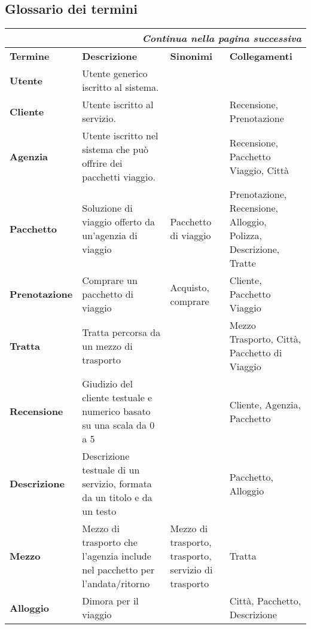 \subsection{Glossario dei termini}
\begin{center}
    \begin{tabularx}{\textwidth}{p{} X p{} p{}}
        \caption{Dizionario termini}\\\toprule\endfirsthead
        \toprule\endhead
        \midrule\multicolumn{4}{r}{\itshape Continua nella pagina successiva}\\\midrule\endfoot
        \bottomrule\endlastfoot
        \textbf{Termine} & \textbf{Descrizione} & \textbf{Sinonimi} & \textbf{Collegamenti} \\
        \midrule
        \textbf{Utente} & Utente generico iscritto al sistema. & &
        \\\midrule
        \textbf{Cliente} & Utente iscritto al servizio. & & Recensione, Prenotazione
        \\\midrule
        \textbf{Agenzia} & Utente iscritto nel sistema che può offrire dei pacchetti viaggio. & & Recensione, Pacchetto Viaggio, Città
        \\\midrule
        \textbf{Pacchetto} & Soluzione di viaggio offerto da un'agenzia di viaggio & Pacchetto di viaggio & Prenotazione, Recensione, Alloggio, Polizza, Descrizione, Tratte
        \\\midrule
        \textbf{Prenotazione} & Comprare un pacchetto di viaggio & Acquisto, comprare & Cliente, Pacchetto Viaggio
        \\\midrule
        \textbf{Tratta} & Tratta percorsa da un mezzo di trasporto & & Mezzo Trasporto, Città, Pacchetto di Viaggio
        \\\midrule
        \textbf{Recensione} & Giudizio del cliente testuale e numerico basato su una scala da 0 a 5 & & Cliente, Agenzia, Pacchetto 
        \\\midrule
        \textbf{Descrizione} & Descrizione testuale di un servizio, formata da un titolo e da un testo & & Pacchetto, Alloggio
        \\\midrule
        \textbf{Mezzo} & Mezzo di trasporto che l'agenzia include nel pacchetto per l'andata/ritorno & Mezzo di trasporto, trasporto, servizio di trasporto & Tratta
        \\\midrule
        \textbf{Alloggio} & Dimora per il viaggio & & Città, Pacchetto, Descrizione
        \\
    \end{tabularx}
\end{center}

